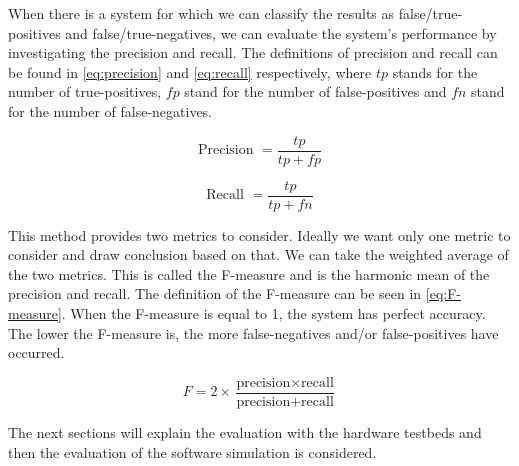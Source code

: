 When there is a system for which we can classify the results as false/true-positives and false/true-negatives, we can evaluate the system's performance by investigating the precision and recall.
The definitions of precision and recall can be found in \autoref{eq:precision} and \autoref{eq:recall} respectively, where $tp$ stands for the number of true-positives, $fp$ stand for the number of false-positives and $fn$ stand for the number of false-negatives.

\begin{equation}
	\label{eq:precision}
	\text{Precision } = \frac{tp}{tp + fp}
\end{equation}

\begin{equation}
	\label{eq:recall}
	\text{Recall } = \frac{tp}{tp + fn}
\end{equation}

This method provides two metrics to consider.
Ideally we want only one metric to consider and draw conclusion based on that.
We can take the weighted average of the two metrics.
This is called the F-measure \cite{sokolova2009systematic} and is the harmonic mean of the precision and recall.
The definition of the F-measure can be seen in \autoref{eq:F-measure}.
When the F-measure is equal to 1, the system has perfect accuracy.
The lower the F-measure is, the more false-negatives and/or false-positives have occurred.

\begin{equation}
	\label{eq:F-measure}
	F = 2 \times \frac{\text{precision} \times \text{recall}}{\text{precision} + \text{recall}}
\end{equation}



The next sections will explain the evaluation with the hardware testbeds and then the evaluation of the software simulation is considered.









